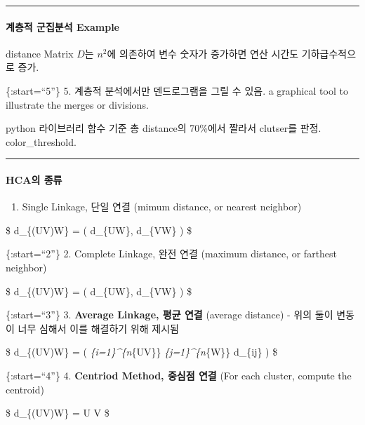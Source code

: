 \documentclass[
]{book}
\providecommand{\tightlist}{%
  \setlength{\itemsep}{0pt}\setlength{\parskip}{0pt}}
\begin{document}
{{{\begin{center}\rule{0.5\linewidth}{0.5pt}\end{center}

\hypertarget{uxacc4uxce35uxc801-uxad70uxc9d1uxbd84uxc11d-example}{%
\paragraph{계층적 군집분석 Example}\label{uxacc4uxce35uxc801-uxad70uxc9d1uxbd84uxc11d-example}}

distance Matrix \(D\)는 \(n^2\)에 의존하여 변수 숫자가 증가하면 연산 시간도 기하급수적으로 증가.

\{:start=``5''\}
5. 계층적 분석에서만 덴드로그램을 그릴 수 있음. a graphical tool to illustrate the merges or divisions.

python 라이브러리 함수 기준 총 distance의 70\%에서 짤라서 clutser를 판정. color\_threshold.

\begin{center}\rule{0.5\linewidth}{0.5pt}\end{center}

\hypertarget{hcauxc758-uxc885uxb958}{%
\paragraph{HCA의 종류}\label{hcauxc758-uxc885uxb958}}

\begin{enumerate}
\def\labelenumi{\arabic{enumi}.}
\tightlist
\item
  Single Linkage, 단일 연결 (mimum distance, or nearest neighbor)
\end{enumerate}

\$
d\_\{(UV)W\} = \min \left( d\_\{UW\}, d\_\{VW\} \right)
\$

\{:start=``2''\}
2. Complete Linkage, 완전 연결 (maximum distance, or farthest neighbor)

\$
d\_\{(UV)W\} = \max \left( d\_\{UW\}, d\_\{VW\} \right)
\$

\{:start=``3''\}
3. \textbf{Average Linkage, 평균 연결} (average distance)
- 위의 둘이 변동이 너무 심해서 이를 해결하기 위해 제시됨

\$
d\_\{(UV)W\} =  \left( \sum\emph{\{i=1\}\^{}\{n}\{UV\}\} \sum\emph{\{j=1\}\^{}\{n}\{W\}\} d\_\{ij\} \right)
\$

\{:start=``4''\}
4. \textbf{Centriod Method, 중심점 연결} (For each cluster, compute the centroid)

\$
d\_\{(UV)W\} =  U  V
\$

}}}
\end{document}
